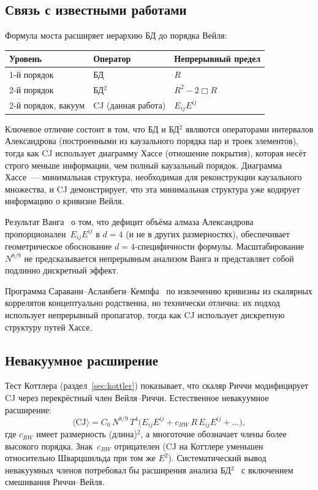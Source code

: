 \documentclass[12pt,a4paper]{article}
\theoremstyle{plain}
\theoremstyle{definition}
\theoremstyle{remark}
\newcommand{\Esq}{E_{ij}E^{ij}}
\newcommand{\CJ}{\mathrm{CJ}}
\begin{document}
\subsection{Связь с известными работами}

Формула моста расширяет иерархию БД до порядка Вейля:
\begin{center}
\begin{tabular}{lll}
\toprule
Уровень & Оператор & Непрерывный предел \\
\midrule
1-й порядок & БД~\cite{BenincasaDowker:2010} & $R$ \\
2-й порядок & БД${}^2$~\cite{deBrito:2023} & $R^2 - 2\Box R$ \\
2-й порядок, вакуум & CJ (данная работа) & $\Esq$ \\
\bottomrule
\end{tabular}
\end{center}

Ключевое отличие состоит в том, что БД и БД${}^2$ являются
операторами интервалов Александрова (построенными из
каузального порядка пар и троек элементов), тогда как CJ
использует диаграмму Хассе (отношение покрытия), которая
несёт строго меньше информации, чем полный каузальный порядок.
Диаграмма Хассе~--- минимальная структура, необходимая для
реконструкции каузального множества, и CJ демонстрирует,
что эта минимальная структура уже кодирует информацию о
кривизне Вейля.

Результат Ванга~\cite{Wang:2019} о том, что дефицит объёма
алмаза Александрова пропорционален~$\Esq$ в $d = 4$ (и не
в других размерностях), обеспечивает геометрическое обоснование
$d = 4$-специфичности формулы.  Масштабирование $N^{8/9}$ не
предсказывается непрерывным анализом Ванга и представляет
собой подлинно дискретный эффект.

Программа Саравани--Асланбеги--Кемпфа~\cite{Saravani:2014}
по извлечению кривизны из скалярных коррелятов концептуально
родственна, но технически отлична: их подход использует
непрерывный пропагатор, тогда как CJ использует дискретную
структуру путей Хассе.

\subsection{Невакуумное расширение}

Тест Коттлера (раздел~\ref{sec:kottler}) показывает, что
скаляр Риччи модифицирует CJ через перекрёстный член
Вейля--Риччи.  Естественное невакуумное расширение:
\begin{equation}\label{eq:non-vacuum}
  \langle \CJ \rangle = C_0\, N^{8/9}\, T^4
  \bigl(\Esq + c_{RW}\, R\, \Esq + \ldots\bigr),
\end{equation}
где $c_{RW}$ имеет размерность (длина)${}^2$, а многоточие
обозначает члены более высокого порядка.  Знак~$c_{RW}$
отрицателен (CJ на Коттлере уменьшен относительно
Шварцшильда при том же $E^2$).  Систематический вывод
невакуумных членов потребовал бы расширения анализа
БД${}^2$~\cite{deBrito:2023} с включением смешивания
Риччи--Вейля.
\end{document}
